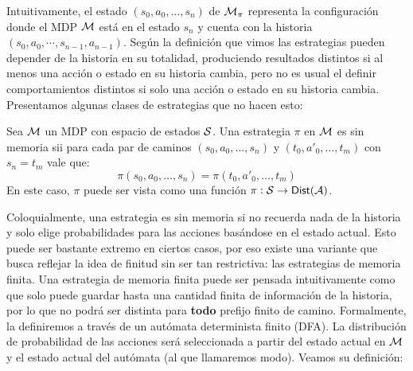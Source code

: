 Intuitivamente, el estado $(s_0, a_0, \dots, s_n)$ de $\mathcal{M}_\pi$ representa la
configuración donde el MDP $\mathcal{M}$ está en el estado $s_n$ y cuenta con la
historia $(s_0, a_0, \cdots, s_{n-1}, a_{n-1})$. Según la definición que vimos
las estrategias pueden depender de la historia en su totalidad, produciendo
resultados distintos si al menos una acción o estado en su historia cambia,
pero no es usual el definir comportamientos distintos si solo una acción o
estado en su historia cambia. Presentamos algunas clases de estrategias que no
hacen esto:

\begin{definition}
	Sea $\mathcal{M}$ un MDP con espacio de estados $\mathcal{S}$. Una estrategia $\pi$ en $\mathcal{M}$ es sin memoria sii para cada par de caminos $(s_0, a_0, \dots, s_n)$ y $(t_0, a'_0, \dots, t_m)$ con $s_n = t_m$ vale que:
	$$\pi(s_0, a_0, \dots, s_n) = \pi(t_0, a'_0, \dots, t_m)$$
	En este caso, $\pi$ puede ser vista como una función $\pi : \mathcal{S} \rightarrow \mathsf{Dist}(\mathcal{A})$.
\end{definition}

Coloquialmente, una estrategia es sin memoria si no recuerda nada de la
historia y solo elige probabilidades para las acciones basándose en el estado
actual. Esto puede ser bastante extremo en ciertos casos, por eso existe una
variante que busca reflejar la idea de finitud sin ser tan restrictiva: las
estrategias de memoria finita. Una estrategia de memoria finita puede ser
pensada intuitivamente como que solo puede guardar hasta una cantidad finita de
información de la historia, por lo que no podrá ser distinta para \textbf{todo}
prefijo finito de camino. Formalmente, la definiremos a través de un autómata
determinista finito (DFA). La distribución de probabilidad de las acciones será
seleccionada a partir del estado actual en $\mathcal{M}$ y el estado actual del autómata
(al que llamaremos modo). Veamos su definición:

